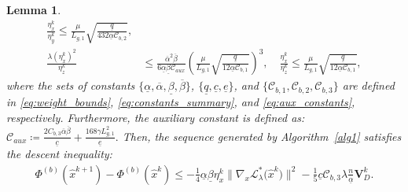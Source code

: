 \documentclass{article}
\theoremstyle{plain}
\newtheorem{lemma}[theorem]{Lemma}
\theoremstyle{definition}
\theoremstyle{remark}
\begin{document}
\begin{lemma}
\begin{subequations}
\begin{align}
        \frac{\eta_{x}^{k}}{\eta_{y}^{k}} \leq \frac{\mu}{L_{g,1}} \sqrt{ \frac{\underline{q}}{432 \underline{\alpha} \mathcal{C}_{b,2}} } , \\
        \frac{\lambda(\eta_{x}^{k})^{2}}{\eta_{z}^{k}} &\leq \frac{\overline{\alpha}^{2} \overline{\beta}}{6 \underline{\alpha} \underline{\beta} \mathcal{C}_{aux}} \left( \frac{\mu}{L_{g,1}} \sqrt{ \frac{\underline{q}}{12 \underline{\alpha}\mathcal{C}_{b,1}} } \right)^3, \quad
        \frac{\eta_{x}^{k}}{\eta_{z}^{k}} \leq \frac{\mu}{L_{g,1}} \sqrt{ \frac{\underline{q}}{12 \underline{\alpha}\mathcal{C}_{b,1}} },
    \end{align}
    \end{subequations}
    where the sets of constants $\{\underline{\alpha}, \overline{\alpha}, \underline{\beta}, \overline{\beta}\}$, $\{\underline{q}, \underline{c}, \underline{e}\}$, and $\{\mathcal{C}_{b,1}, \mathcal{C}_{b,2}, \mathcal{C}_{b,3}\}$ are defined in \eqref{eq:weight_bounds}, \eqref{eq:constants_summary}, and \eqref{eq:aux_constants}, respectively. Furthermore, the auxiliary constant is defined as:
    \(
        \mathcal{C}_{aux} \coloneqq \frac{2 C_{b,3} \overline{\alpha} \overline{\beta}}{\underline{c}} + \frac{168 \gamma L_{g,1}^{2}}{\underline{e}}.
    \)
Then, the sequence generated by Algorithm~\ref{alg1} satisfies the descent inequality:
\begin{align}\label{eq:lyapunov_descent}
    \Phi^{(b)}({\hat{x}}^{k+1}) - \Phi^{(b)}({\hat{x}}^{k}) \leq - \frac{1}{4}\underline{\alpha}\underline{\beta}\eta_x^{k}\big\| \nabla_{x} \mathcal{L}_{\lambda}^{*}\big({\hat{x}}^k\big) \big\|^{2} - \frac{1}{5}\underline{c}\mathcal{C}_{b,3}\lambda\frac{n}{\underline{\alpha}} \mathbf{V}_{D}^{k}.
\end{align}
\end{lemma}
\end{document}
